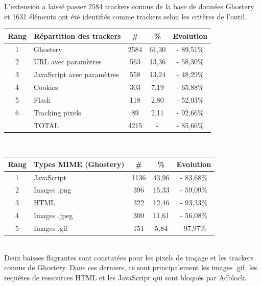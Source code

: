 L'extension a laissé passer 2584 trackers connus de la base de données Ghostery et 1631 éléments ont été identifiés comme trackers selon les critères de l'outil.\\

\begin{tabular}{ c | p{5cm} | c | c || c | }
   Rang & Répartition des trackers & \# & \% & Evolution \\
   \hline
   \hline
   1 & Ghostery & 2584 & 61,30 & - 89,51\% \\
   2 & URL avec paramètres & 563 & 13,36 & - 58,30\% \\
   3 & JavaScript avec paramètres & 558 & 13,24 & - 48,29\% \\
   4 & Cookies & 303 & 7,19 & - 65,88\% \\
   5 & Flash & 118 & 2,80 & - 52,03\% \\
   6 & Tracking pixels & 89 & 2,11 & - 92,66\% \\
   \hline
    & TOTAL & 4215 & - & - 85,66\%\\
   \hline
\end{tabular}
\\[1cm]

\begin{tabular}{ c | p{5cm} | c | c | c | }
   Rang & Types MIME (Ghostery) & \# & \% & Evolution\\
   \hline
   \hline
   1 & JavaScript & 1136 & 43,96 & - 83,68\% \\
   2 & Images .png & 396 & 15,33 & - 59,09\% \\
   3 & HTML & 322 & 12,46 & - 93,33\% \\
   4 & Images .jpeg & 300 & 11,61 & - 56,08\% \\
   5 & Images .gif & 151 & 5,84 & -97,97\% \\
   \hline
\end{tabular}
\\[.3cm]

Deux baisses flagrantes sont constatées pour les pixels de traçage et les trackers connus de Ghostery. Dans ces derniers, ce sont principalement les images .gif, les requêtes de ressources HTML et les JavaScript qui sont bloqués par Adblock.


